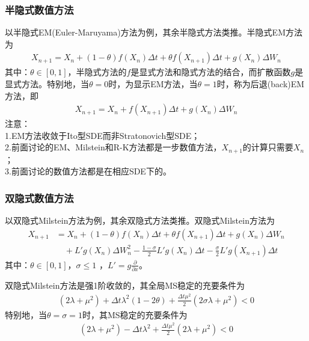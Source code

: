         \subsubsection{半隐式数值方法}
            \label{subsubsec:半隐式数值方法}
            \par
            以半隐式EM(Euler-Maruyama)方法为例，其余半隐式方法类推。半隐式EM方法为
            \begin{align*}
            X_{n+1} = X_n + (1-\theta )f(X_n)\Delta t+ \theta f(X_{n+1})\Delta t+ g(X_n)\Delta W_n
            \end{align*}
            其中：$\theta \in [0,1]$，半隐式方法的$f$是显式方法和隐式方法的结合，而扩散函数$g$是显式方法。特别地，当$\theta  = 0$时，为显示EM方法，当$\theta = 1$时，称为后退(back)EM方法，即
            \begin{align*}
            X_{n+1} = X_n + f(X_{n+1})\Delta t+ g(X_n)\Delta W_n
            \end{align*}
            注意：\\
            1.EM方法收敛于Ito型SDE而非Stratonovich型SDE；\\
            2.前面讨论的EM、Milstein和R-K方法都是一步数值方法，$X_{n+1}$的计算只需要$X_n$；\\
            3.前面讨论的数值方法都是在相应SDE下的。
        \subsubsection{双隐式数值方法}
            \label{subsubsec:双隐式数值方法}
            \par
            以双隐式Milstein方法为例，其余双隐式方法类推。双隐式Milstein方法为
            \begin{align*}
            X_{n+1} &= X_n + (1-\theta )f(X_n)\Delta t+ \theta f(X_{n+1})\Delta t+ g(X_n)\Delta W_n\\
            &\quad + L'g(X_n)\Delta W_n^2 - \frac{1- \sigma}{2} L'g(X_n)\Delta t -\frac{\sigma}{2}L'g(X_{n+1})\Delta t
            \end{align*}
            其中：$\theta \in [0,1]$，$\sigma \leqslant 1$ ，$L' = g\frac{\partial}{\partial x}$。
            \par
            双隐式Milstein方法是强1阶收敛的，其全局MS稳定的充要条件为
            \begin{align*}
            (2\lambda + \mu^2) + \Delta t\lambda^2(1-2\theta)+\frac{\Delta t \mu^2}{2}(2\sigma \lambda+ \mu^2)<0
            \end{align*}
            特别地，当$\theta = \sigma = 1$时，其MS稳定的充要条件为
            \begin{align*}
            (2\lambda + \mu^2) - \Delta t\lambda^2+\frac{\Delta t \mu^2}{2}(2 \lambda+ \mu^2)<0
            \end{align*}
